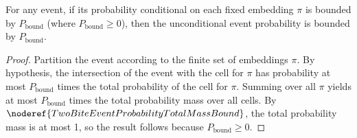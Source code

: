 \begin{helper}
For any event, if its probability conditional on each fixed embedding \(\pi\) is bounded by \(P_{\text{bound}}\) (where \(P_{\text{bound}} \ge 0\)), then the unconditional event probability is bounded by \(P_{\text{bound}}\).
\end{helper}
\begin{proof}
Partition the event according to the finite set of embeddings \(\pi\). By hypothesis, the intersection of the event with the cell for \(\pi\) has probability at most \(P_{\text{bound}}\) times the total probability of the cell for \(\pi\). Summing over all \(\pi\) yields at most \(P_{\text{bound}}\) times the total probability mass over all cells. By \(\noderef{TwoBiteEventProbabilityTotalMassBound}\), the total probability mass is at most 1, so the result follows because \(P_{\text{bound}} \ge 0\).
\end{proof}

